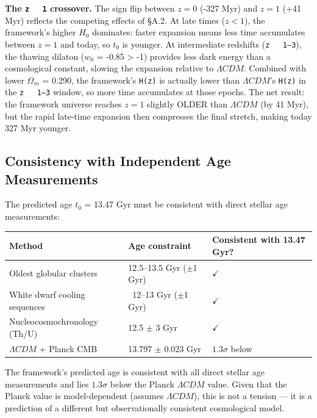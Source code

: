 \documentclass[aps,prd,preprint,superscriptaddress,longbibliography]{revtex4-2}
\begin{document}
\textbf{The \texttt{z ~ 1} crossover.} The sign flip between $z = 0$ (-327 Myr) and $z = 1$ (+41 Myr) reflects the competing effects of \S{}A.2. At late times ($z < 1$), the framework's higher $H_{0}$ dominates: faster expansion means less time accumulates between $z = 1$ and today, so $t_{0}$ is younger. At intermediate redshifts (\texttt{z ~ 1--3}), the thawing dilaton ($w_{0}$ = -0.85 > -1) provides less dark energy than a cosmological constant, slowing the expansion relative to $\Lambda CDM$. Combined with lower $\Omega_m$ = 0.290, the framework's \texttt{H(z)} is actually lower than $\Lambda CDM$'s \texttt{H(z)} in the \texttt{z ~ 1--3} window, so more time accumulates at those epochs. The net result: the framework universe reaches $z = 1$ slightly OLDER than $\Lambda CDM$ (by 41 Myr), but the rapid late-time expansion then compresses the final stretch, making today 327 Myr younger.



\subsection{Consistency with Independent Age Measurements}

The predicted age $t_{0}$ = 13.47 Gyr must be consistent with direct stellar age measurements:


\begin{table}[H]
\begin{ruledtabular}
\begin{tabular}{p{5.0cm}p{5.0cm}p{5.0cm}}
Method & Age constraint & Consistent with 13.47 Gyr? \\
\hline
Oldest globular clusters & 12.5--13.5 Gyr ($\pm$1 Gyr) & $\checkmark$ \\
White dwarf cooling sequences & ~12--13 Gyr ($\pm$1 Gyr) & $\checkmark$ \\
Nucleocosmochronology (Th/U) & 12.5 $\pm$ 3 Gyr & $\checkmark$ \\
$\Lambda CDM$ + Planck CMB & 13.797 $\pm$ 0.023 Gyr & $1.3\sigma$ below \\
\end{tabular}
\end{ruledtabular}
\end{table}

The framework's predicted age is consistent with all direct stellar age measurements and lies $1.3\sigma$ below the Planck $\Lambda CDM$ value. Given that the Planck value is model-dependent (assumes $\Lambda CDM$), this is not a tension --- it is a prediction of a different but observationally consistent cosmological model.
\end{document}
